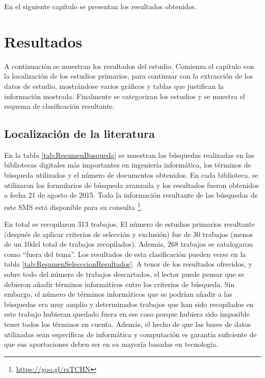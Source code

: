 En el siguiente capítulo se presentan los resultados obtenidos.

\section{Resultados}

A continuación se muestran los resultados del estudio. Comienza el capítulo con la localización de los estudios primarios, para continuar con la extracción de los datos de estudio, mostrándose varios gráficos y tablas que justifican la información mostrada. Finalmente se categorizan los estudios y se muestra el esquema de clasificación resultante.

\subsection{Localización de la literatura}

En la tabla \ref{tab:ResumenBusqueda} se muestran las búsquedas realizadas en las bibliotecas digitales más importantes en ingeniería informática, los términos de búsqueda utilizados y el número de documentos obtenidos. En cada biblioteca, se utilizaron los formularios de búsqueda avanzada y los resultados fueron obtenidos a fecha 21 de agosto de 2015. Toda la información resultante de las búsquedas de este SMS está disponible para su consulta \footnote{\url{https://goo.gl/rzTCHN}}.


En total se recopilaron 313 trabajos. El número de estudios primarios resultante (después de aplicar criterios de selección y exclusión) fue de 30 trabajos (menos de un 10\percentage{ }del total de trabajos recopilados). Además, 268 trabajos se catalogaron como ``fuera del tema''. Los resultados de esta clasificación pueden verse en la tabla \ref{tab:ResumenSelecccionResultados}. A tenor de los resultados ofrecidos, y sobre todo del número de trabajos descartados, el lector puede pensar que se debieron añadir términos informáticos entre los criterios de búsqueda. Sin embargo, el número de términos informáticos que se podrían añadir a las búsquedas era muy amplio y determinados trabajos que han sido recopilados en este trabajo hubieran quedado fuera en ese caso porque hubiera sido imposible tener todos los términos en cuenta. Además, el hecho de que las bases de datos utilizadas sean específicas de informática y computación es garantía suficiente de que sus aportaciones deben ser en su mayoría basadas en tecnología.

